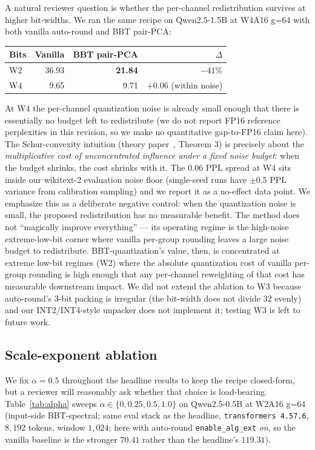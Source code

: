 \documentclass[11pt]{article}
\begin{document}
A natural reviewer question is whether the per-channel redistribution survives at higher bit-widths. We ran the same recipe on Qwen2.5-1.5B at W4A16 g=64 with both vanilla auto-round and BBT pair-PCA:
\begin{center}
\begin{tabular}{lrrr}
\toprule
Bits & Vanilla & BBT pair-PCA & $\Delta$ \\
\midrule
W2 & 36.93 & \textbf{21.84} & $-41\%$ \\
W4 & 9.65 & 9.71 & $+0.06$ (within noise) \\
\bottomrule
\end{tabular}
\end{center}
At W4 the per-channel quantization noise is already small enough that there is essentially no budget left to redistribute (we do not report FP16 reference perplexities in this revision, so we make no quantitative gap-to-FP16 claim here). The Schur-convexity intuition (theory paper~\cite{bbtTheoryCompanion}, Theorem 3) is precisely about the \emph{multiplicative cost of unconcentrated influence under a fixed noise budget}: when the budget shrinks, the cost shrinks with it. The $0.06$ PPL spread at W4 sits inside our wikitext-2 evaluation noise floor (single-seed runs have $\pm 0.5$ PPL variance from calibration sampling) and we report it as a no-effect data point. We emphasize this as a deliberate negative control: when the quantization noise is small, the proposed redistribution has no measurable benefit. The method does not ``magically improve everything'' --- its operating regime is the high-noise extreme-low-bit corner where vanilla per-group rounding leaves a large noise budget to redistribute. BBT-quantization's value, then, is concentrated at extreme low-bit regimes (W2) where the absolute quantization cost of vanilla per-group rounding is high enough that any per-channel reweighting of that cost has measurable downstream impact. We did not extend the ablation to W3 because auto-round's 3-bit packing is irregular (the bit-width does not divide $32$ evenly) and our INT2/INT4-style unpacker does not implement it; testing W3 is left to future work.

\subsection{Scale-exponent ablation}
\label{sec:alpha_ablation}

We fix $\alpha = 0.5$ throughout the headline results to keep the recipe closed-form, but a reviewer will reasonably ask whether that choice is load-bearing. Table~\ref{tab:alpha} sweeps $\alpha \in \{0, 0.25, 0.5, 1.0\}$ on Qwen2.5-0.5B at W2A16 g=64 (input-side BBT-spectral; same eval stack as the headline, \texttt{transformers 4.57.6}, $8{,}192$ tokens, window $1{,}024$; here with auto-round \texttt{enable\_alg\_ext} \emph{on}, so the vanilla baseline is the stronger $70.41$ rather than the headline's $119.31$).
\end{document}
